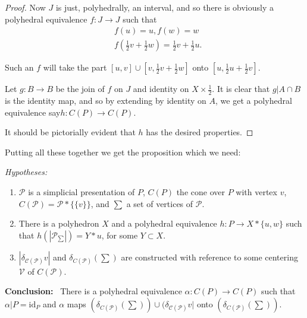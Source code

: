 \begin{proof}
Now $J$ is just, polyhedrally, an interval, and so there is obviously a polyhedral equivalence $f:J\to J$ such that 
\begin{align*}
& f(u)=u,f(w)=w\\
& f(\frac{1}{2}v+\frac{1}{2}w)=\frac{1}{2}v+\frac{1}{2}u.
\end{align*}

Such an $f$ will take the part $[u,v]\cup [v,\frac{1}{2}v+\frac{1}{2}w]$ onto $[u,\frac{1}{2}u+\frac{1}{2}v]$.

Let $g:B\to B$ be the join of $f$ on $J$ and identity on $X\times \frac{1}{2}$. It is clear that $g|A\cap B$ is the identity map, and so by extending by identity on $A$, we get a polyhedral equivalence say\pageoriginale $h:C(P)\to C(P)$.

It should be pictorially evident that $h$ has the desired properties.
\end{proof}

Putting all these together we get the proposition which we need:

\begin{proposition}\label{chap6-prop6.8.5}
{\em Hypotheses:}
\begin{enumerate}
\renewcommand{\labelenumi}{\rm(\theenumi)}
\item $\mathscr{P}$ is a simplicial presentation of $P$, $C(P)$ the cone over $P$ with vertex $v$, $C(\mathscr{P})=\mathscr{P}\ast\{\{v\}\}$, and $\sum$ a set of vertices of $\mathscr{P}$.

\item There is a polyhedron $X$ and a polyhedral equivalence $h:P\to X\ast \{u,w\}$ such that $h(|\mathscr{P}_{\sum}|)=Y\ast u$, for some $Y\subset X$.

\item $|\delta_{\mathscr{C}(\mathscr{P})}v|$ and $\delta_{C(\mathscr{P})}(\sum)$ are constructed with reference to some centering $\mathscr{V}$ of $C(\mathscr{P})$.
\end{enumerate}
\end{proposition}

\noindent
{\bf Conclusion:}~ There is a polyhedral equivalence $\alpha:C(P)\to C(P)$ such that $\alpha|P=\text{id}_{P}$ and $\alpha$ maps $(\delta_{C(\mathscr{P})}(\sum))\cup (\delta_{\mathscr{C}(\mathscr{P})}v|$ onto $(\delta_{C(\mathscr{P})}(\sum))$.

